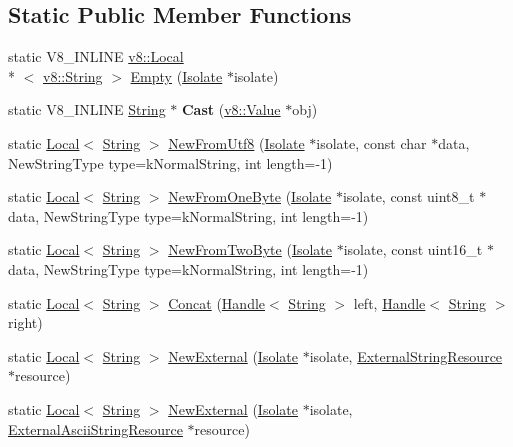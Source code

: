 \subsection*{Static Public Member Functions}
\begin{DoxyCompactItemize}
\item 
static V8\-\_\-\-I\-N\-L\-I\-N\-E \hyperlink{classv8_1_1Local}{v8\-::\-Local}\\*
$<$ \hyperlink{classv8_1_1String}{v8\-::\-String} $>$ \hyperlink{classv8_1_1String_aa393d47baa54467fe57001065e49194b}{Empty} (\hyperlink{classv8_1_1Isolate}{Isolate} $\ast$isolate)
\item 
\hypertarget{classv8_1_1String_a826d60798dc152cea64a7636737b03b9}{static V8\-\_\-\-I\-N\-L\-I\-N\-E \hyperlink{classv8_1_1String}{String} $\ast$ {\bfseries Cast} (\hyperlink{classv8_1_1Value}{v8\-::\-Value} $\ast$obj)}\label{classv8_1_1String_a826d60798dc152cea64a7636737b03b9}

\item 
static \hyperlink{classv8_1_1Local}{Local}$<$ \hyperlink{classv8_1_1String}{String} $>$ \hyperlink{classv8_1_1String_aa4b8c052f5108ca6350c45922602b9d4}{New\-From\-Utf8} (\hyperlink{classv8_1_1Isolate}{Isolate} $\ast$isolate, const char $\ast$data, New\-String\-Type type=k\-Normal\-String, int length=-\/1)
\item 
static \hyperlink{classv8_1_1Local}{Local}$<$ \hyperlink{classv8_1_1String}{String} $>$ \hyperlink{classv8_1_1String_afa8026ed1337564a9fd15dc56aceaa83}{New\-From\-One\-Byte} (\hyperlink{classv8_1_1Isolate}{Isolate} $\ast$isolate, const uint8\-\_\-t $\ast$data, New\-String\-Type type=k\-Normal\-String, int length=-\/1)
\item 
static \hyperlink{classv8_1_1Local}{Local}$<$ \hyperlink{classv8_1_1String}{String} $>$ \hyperlink{classv8_1_1String_a876615eb027092a6a71a4e7d69b82d00}{New\-From\-Two\-Byte} (\hyperlink{classv8_1_1Isolate}{Isolate} $\ast$isolate, const uint16\-\_\-t $\ast$data, New\-String\-Type type=k\-Normal\-String, int length=-\/1)
\item 
static \hyperlink{classv8_1_1Local}{Local}$<$ \hyperlink{classv8_1_1String}{String} $>$ \hyperlink{classv8_1_1String_a3d0b9c9208cf5054adb048e360fb73ff}{Concat} (\hyperlink{classv8_1_1Handle}{Handle}$<$ \hyperlink{classv8_1_1String}{String} $>$ left, \hyperlink{classv8_1_1Handle}{Handle}$<$ \hyperlink{classv8_1_1String}{String} $>$ right)
\item 
static \hyperlink{classv8_1_1Local}{Local}$<$ \hyperlink{classv8_1_1String}{String} $>$ \hyperlink{classv8_1_1String_a5574e60f0000c5042cf558f145a8aba2}{New\-External} (\hyperlink{classv8_1_1Isolate}{Isolate} $\ast$isolate, \hyperlink{classv8_1_1String_1_1ExternalStringResource}{External\-String\-Resource} $\ast$resource)
\item 
static \hyperlink{classv8_1_1Local}{Local}$<$ \hyperlink{classv8_1_1String}{String} $>$ \hyperlink{classv8_1_1String_a7d48181c3af1ec31204ecec9b3d81e33}{New\-External} (\hyperlink{classv8_1_1Isolate}{Isolate} $\ast$isolate, \hyperlink{classv8_1_1String_1_1ExternalAsciiStringResource}{External\-Ascii\-String\-Resource} $\ast$resource)
\end{DoxyCompactItemize}


